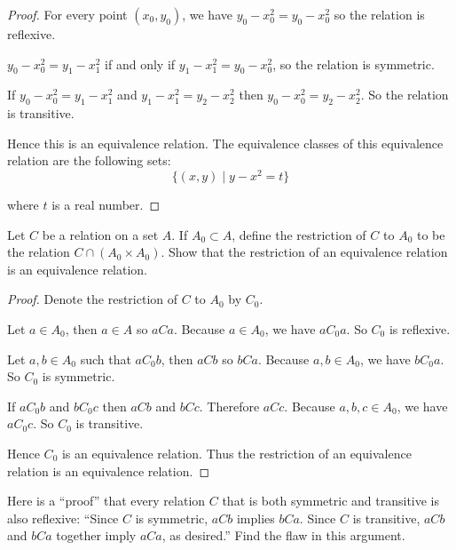\begin{proof}
    For every point $(x_{0}, y_{0})$, we have $y_{0} - x_{0}^{2} = y_{0} - x_{0}^{2}$ so the relation is reflexive.

    $y_{0} - x_{0}^{2} = y_{1} - x_{1}^{2}$ if and only if $y_{1} - x_{1}^{2} = y_{0} - x_{0}^{2}$, so the relation is symmetric.

    If $y_{0} - x_{0}^{2} = y_{1} - x_{1}^{2}$ and $y_{1} - x_{1}^{2} = y_{2} - x_{2}^{2}$ then $y_{0} - x_{0}^{2} = y_{2} - x_{2}^{2}$. So the relation is transitive.

    Hence this is an equivalence relation. The equivalence classes of this equivalence relation are the following sets:
    \[
        \{ (x, y) \mid y - x^{2} = t \}
    \]

    where $t$ is a real number.
\end{proof}

\begin{exercise}\label{chapter1:section3:exercise2}
    Let $C$ be a relation on a set $A$. If $A_{0} \subset A$, define the restriction of $C$ to $A_{0}$ to be the relation $C \cap (A_{0} \times A_{0})$. Show that the restriction of an equivalence relation is an equivalence relation.
\end{exercise}

\begin{proof}
    Denote the restriction of $C$ to $A_{0}$ by $C_{0}$.

    Let $a\in A_{0}$, then $a\in A$ so $aCa$. Because $a\in A_{0}$, we have $aC_{0}a$. So $C_{0}$ is reflexive.

    Let $a, b\in A_{0}$ such that $aC_{0}b$, then $aCb$ so $bCa$. Because $a, b\in A_{0}$, we have $bC_{0}a$. So $C_{0}$ is symmetric.

    If $aC_{0}b$ and $bC_{0}c$ then $aCb$ and $bCc$. Therefore $aCc$. Because $a, b, c\in A_{0}$, we have $aC_{0}c$. So $C_{0}$ is transitive.

    Hence $C_{0}$ is an equivalence relation. Thus the restriction of an equivalence relation is an equivalence relation.
\end{proof}

\begin{exercise}\label{chapter1:section3:exercise3}
    Here is a ``proof'' that every relation $C$ that is both symmetric and transitive is also reflexive: ``Since $C$ is symmetric, $aCb$ implies $bCa$. Since $C$ is transitive, $aCb$ and $bCa$ together imply $aCa$, as desired{.}'' Find the flaw in this argument.
\end{exercise}

